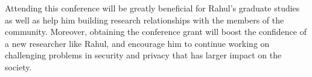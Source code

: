 \documentclass[11pt,a4paper,notitlepage]{article}
\begin{document}
Attending this conference will be greatly beneficial for Rahul's
graduate studies as well as help him building research relationships
with the members of the community.  Moreover, obtaining the conference
grant will boost the confidence of a new researcher like Rahul, and
encourage him to continue working on challenging problems in security
and privacy that has larger impact on the society.


\end{document}
